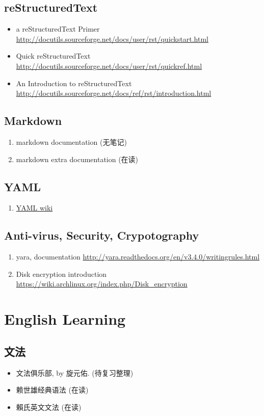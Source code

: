 \documentclass{article}
\begin{document}
\subsection{reStructuredText}
\begin{itemize}
    \item a reStructuredText Primer \url{http://docutils.sourceforge.net/docs/user/rst/quickstart.html}
    \item Quick reStructuredText \url{http://docutils.sourceforge.net/docs/user/rst/quickref.html}
    \item An Introduction to reStructuredText \url{http://docutils.sourceforge.net/docs/ref/rst/introduction.html}
\end{itemize}
%
\subsection{Markdown}
\begin{enumerate}
    \item markdown documentation (无笔记)
    \item markdown extra documentation (在读)
\end{enumerate}
\subsection{YAML}
\begin{enumerate}
    \item \href{https://en.wikipedia.org/wiki/YAML}{YAML wiki}
\end{enumerate}
\subsection{Anti-virus, Security, Crypotography}
\begin{enumerate}
    \item yara, documentation \url{http://yara.readthedocs.org/en/v3.4.0/writingrules.html}
    \item Disk encryption introduction \url{https://wiki.archlinux.org/index.php/Disk_encryption}
\end{enumerate}
\section{English Learning}
\subsection{文法}
\begin{itemize}
    \item 文法俱乐部, by 旋元佑. (待复习整理)
    \item 赖世雄经典语法 (在读)
    \item 賴氏英文文法 (在读)
\end{itemize}
\end{document}
